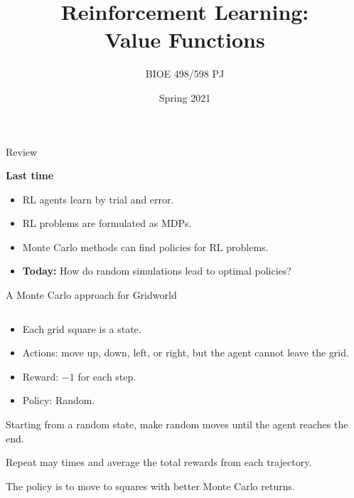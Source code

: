 \documentclass[9pt]{beamer}
\title{Reinforcement Learning:\\Value Functions}
\author{BIOE 498/598 PJ}
\date{Spring 2021}
\newcommand\lspace{\addtolength{\itemsep}{0.5\baselineskip}}
\begin{document}
\frame{\titlepage}

\begin{frame}{Review}

\textbf{Last time}
\begin{itemize}\lspace
	\item RL agents learn by trial and error.
	\item RL problems are formulated as MDPs.
	\item Monte Carlo methods can find policies for RL problems.
	\item<2-> \textbf{Today:} How do random simulations lead to optimal policies?
\end{itemize}
	
\end{frame}

\begin{frame}{A Monte Carlo approach for Gridworld}

\begin{columns}
\begin{column}{0.5\textwidth}
	\begin{itemize}
		\item Each grid square is a state.
		\item Actions: move up, down, left, or right, but the agent cannot leave the grid.
		\item Reward: $-1$ for each step.
		\item Policy: Random.
	\end{itemize}
	
\bigskip
Starting from a random state, make random moves until the agent reaches the end.

\bigskip
Repeat may times and average the total rewards from each trajectory.

\bigskip
The policy is to move to squares with better Monte Carlo returns.
\end{column}


\end{columns}
\end{frame}
\end{document}
